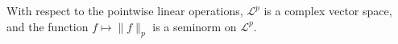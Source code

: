 With respect to the pointwise linear operations, $\mathcal{L}^p$ is a complex vector space, and the function $f \mapsto \|f\|_p$ is a seminorm on $\mathcal{L}^p$.
